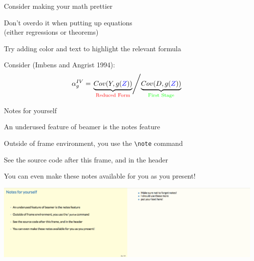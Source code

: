 \documentclass[notes,11pt, aspectratio=169]{beamer}
\newenvironment{wideitemize}{\itemize\addtolength{\itemsep}{10pt}}{\enditemize}
\begin{document}
\begin{frame}{Consider making your math prettier}
  \begin{wideitemize}
    \item Don't overdo it when putting up equations\\(either regressions or theorems)
    \item Try adding color and text to highlight the relevant formula
    \item Consider (Imbens and Angrist 1994): 
      \begin{equation*}
        \alpha_{g}^{IV} = \left. \underbrace{Cov(Y, g(\textcolor{blue}{Z}))}_{\text{\textcolor{red}{Reduced Form}}} \middle/ \underbrace{Cov(D, g(\textcolor{blue}{Z}))}_{\text{\textcolor{green}{First Stage}}} \right.
      \end{equation*}
  \end{wideitemize}
\end{frame}


\begin{frame}{Notes for yourself}
  \begin{wideitemize}
    \item An underused feature of beamer is the notes feature
    \item Outside of frame environment, you use the \texttt{\textbackslash note} command
    \item See the source code after this frame, and in the header
    \item You can even make these notes available for you as you present!
  \end{wideitemize}
\begin{center}
  \includegraphics[width=.9\linewidth]{example_note.pdf}
\end{center}
\end{frame}
% 
\end{document}
